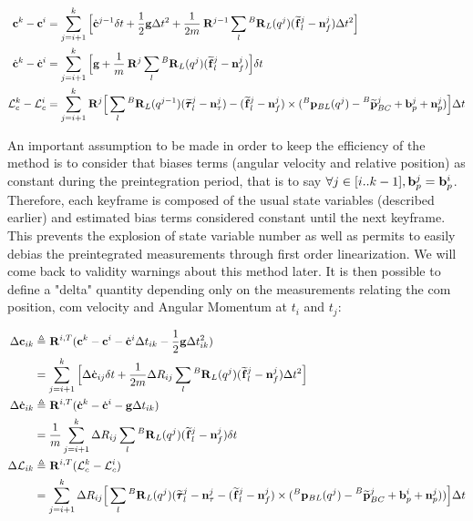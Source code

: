 \documentclass[11pt]{article}
\newcommand{\Rot}[2]{\prescript{#1}{}{\bfR}_{#2}}
\newcommand{\noise}{\bfn}
\newcommand{\bias}{\bfb}
\newcommand{\posi}[2]{\prescript{#1}{}{\bfp}_{#2}}
\newcommand{\posim}[2]{\prescript{#1}{}{\widetilde{\bfp}}_{#2}}
\newcommand{\forcem}[2]{\prescript{#1}{}{\widetilde{\bff}}_{#2}}
\newcommand{\torquem}[2]{\prescript{#1}{}{\widetilde{\pmb{\tau}}}_{#2}}
\newcommand{\AM}{\mathcal{L}}
\newcommand{\COM}{\bfc}
\newcommand{\COMd}{\dot{\bfc}}
\newcommand{\grav}{\bfg}
\begin{document}
\begin{equation}
\begin{split}
\COM^{k} - \COM^{i} &= \sum_{j=i+1}^{k} \Big[ 
\COMd^{j-1} \delta t 
+ \frac{1}{2}\bfg \Delta t^2 + \frac{1}{2m} \Rot{}{}^{j-1} \sum_l \Rot{B}{L}(q^{j}) (\forcem{}{l}^{j} - \noise_f^{j})\Delta t^2 \Big]
\\
\COMd^{k} - \COMd^{i} &= \sum_{j=i+1}^{k} \Big[ 
\bfg + \frac{1}{m} \Rot{}{}^{j} \sum_l \Rot{B}{L}(q^{j}) (\forcem{}{l}^{j} - \noise_f^{j}) \Big] \delta t 
\\
\AM_c^{k} - \AM_c^{i} &=  \sum_{j=i+1}^{k} \Rot{}{}^{j} \Big[ 
\sum_l \Rot{B}{L}(q^{j-1}) (\torquem{}{l}^{j} - \noise_{\tau}^{j}) - (\forcem{}{l}^{j} - \noise_f^{j}) \times (\posi{B}{BL}(q^j) - \posim{B}{BC}^j + \bias_{p}^j + \noise_p^j) \Big]  \Delta t
\end{split}
\label{eq:COMij}
\end{equation}

An important assumption to be made in order to keep the efficiency of the method is to consider that biases terms (angular velocity and relative position) as constant during the preintegration period, that is to say $\forall j \in [i..k-1], \bias_p^j = \bias_p^i $. Therefore, each keyframe is composed of the usual state variables (described earlier) and estimated bias terms considered constant until the next keyframe. This prevents the explosion of state variable number as well as permits to easily debias the preintegrated measurements through first order linearization. We will come back to validity warnings about this method later.
It is then possible to define a "delta" quantity depending only on the measurements relating the com position, com velocity and Angular Momentum at \(t_i\) and \(t_j\):

\begin{equation}
\begin{split}
    \Delta \COM_{ik} &\triangleq \Rot{}{}^{i,T} (\COM^k - \COM^i - \COMd{}{}^i \Delta t_{ik} - \frac{1}{2}\grav \Delta t_{ik}^2) 
    \\
    &= \sum_{j=i+1}^{k} \Big[ \Delta \COMd_{ij} \delta t + \frac{1}{2m} \Delta R_{ij} \sum_l \Rot{B}{L}(q^{j}) (\forcem{}{l}^{j} - \noise_f^{j}) \Delta t^2 \Big]
\\
    \Delta \COMd_{ik} &\triangleq \Rot{}{}^{i,T} (\COMd^{k} - \COMd^{i} - \bfg \Delta t_{ik})
\\
    &= \frac{1}{m} \sum_{j=i+1}^{k} \Delta R_{ij} \sum_l \Rot{B}{L}(q^{j}) (\forcem{}{l}^{j} - \noise_f^{j}) \delta t 
\\
    \Delta \AM_{ik} &\triangleq \Rot{}{}^{i,T} (\AM_c^{k} - \AM_c^{i})
\\
     &=  \sum_{j=i+1}^{k} \Delta R_{ij} \Big[ 
    \sum_l \Rot{B}{L}(q^{j}) (\torquem{}{l}^{j} - \noise_{\tau}^{j} - (\forcem{}{l}^{j} - \noise_f^{j}) \times (\posi{B}{BL}(q^j) - \posim{B}{BC}^j + \bias_{p}^i + \noise_p^j)) \Big]  \Delta t
\end{split}
\label{eq:DeltaFT}
\end{equation}
\end{document}
